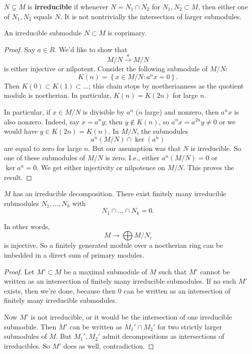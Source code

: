 \begin{definition} 
$N \subsetneq M$ is \textbf{irreducible} if whenever $N = N_1 \cap N_2$ for $N_1,
N_2 \subset M$, then either one of $N_1, N_2$ equals $N$. It is not
nontrivially the intersection of larger submodules. 
\end{definition} 

\begin{proposition} 
An irreducible submodule $N \subset M$ is coprimary.
\end{proposition} 
\begin{proof} 
Say $a \in R$. We'd like to show that 
\[ M/N \stackrel{a}{\to} M/N  \]
is either injective or nilpotent.
Consider  the following submodule of $M/N$:
\[ K(n) =  \left\{x \in M/N: a^n x = 0\right\} . \]
Then $K(0) \subset K(1) \subset \dots$; this chain stops by noetherianness as
the quotient module is noetherian.
In particular, $K(n) = K(2n)$ for large $n$. 

In particular, if $x \in M/N$ is divisible by $a^n$ ($n$ large) and nonzero, then $a^n x$
is also nonzero. Indeed, say $x = a^n y$; then $y \notin K(n)$, so $a^{n}x =
a^{2n}y \neq 0$ or we would have $y \in K(2n) = K(n)$. In $M/N$, the submodules
\[ a^n(M/N) \cap \ker(a^n)  \]
are equal to zero for large $n$. But our assumption was that $N$ is
irreducible.  So one of these submodules of $M/N$ is zero. I.e., either
$a^n(M/N) = 0$ or $\ker a^n = 0$. We get either injectivity or nilpotence on
$M/N$. This proves the result.
\end{proof} 

\begin{proposition} 
$M$ has an irreducible decomposition. There exist finitely many irreducible
submodules $N_1, \dots, N_k$ with
\[  N_1 \cap \dots \cap N_k = 0. \]
\end{proposition} 
In other words,
\[  M \to \bigoplus M/N_i  \]
is injective.
So a finitely generated module over a noetherian ring can be imbedded in a direct sum of
primary modules. 

\begin{proof} 
Let $M' \subset M$ be a maximal submodule of $M$ such that $M'$ cannot be
written as an intersection of finitely many irreducible submodules. If no such
$M'$ exists, then we're done, because then $0$ can be written as an
intersection of finitely many irreducible submodules.

Now $M'$ is not irreducible, or it would be the intersection of one irreducible
submodule.
Then $M'$ can be written as $M_1' \cap M_2'$ for two strictly
larger submodules of $M$.  But $M_1', M_2'$ admit decompositions as
intersections of irreducibles. So $M'$ does as well, contradiction. 
\end{proof} 

